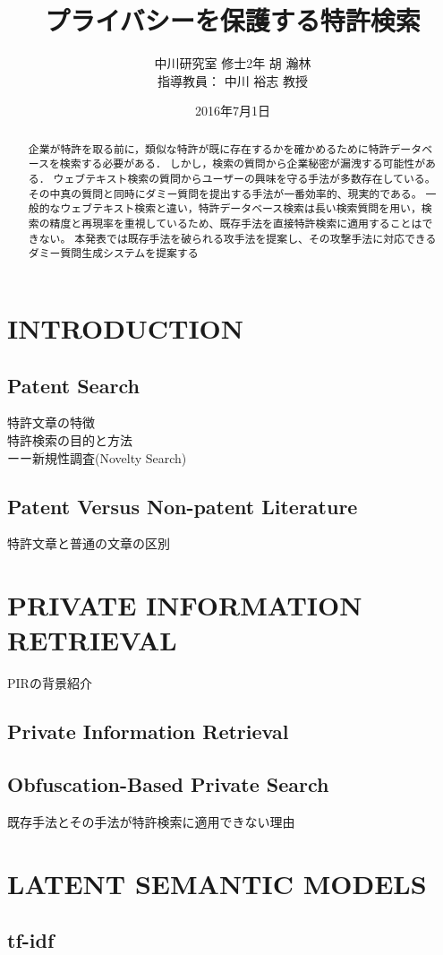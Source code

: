 \documentclass{jsarticle}
\title{プライバシーを保護する特許検索}
\author{中川研究室 修士2年 胡 瀚林\\指導教員： 中川 裕志 教授}
\date{2016年7月1日}
\theoremstyle{definition}
\begin{document}
\maketitle
\begin{abstract}
企業が特許を取る前に，類似な特許が既に存在するかを確かめるために特許データベースを検索する必要がある．
しかし，検索の質問から企業秘密が漏洩する可能性がある．
ウェブテキスト検索の質問からユーザーの興味を守る手法が多数存在している。
その中真の質問と同時にダミー質問を提出する手法が一番効率的、現実的である。
一般的なウェブテキスト検索と違い，特許データベース検索は長い検索質問を用い，検索の精度と再現率を重視しているため、既存手法を直接特許検索に適用することはできない。
本発表では既存手法を破られる攻手法を提案し、その攻撃手法に対応できるダミー質問生成システムを提案する
\end{abstract}


\section{INTRODUCTION}


\subsection{Patent Search}
特許文章の特徴\\
特許検索の目的と方法\\
ーー新規性調査(Novelty Search)
\subsection{Patent Versus Non-patent Literature}
特許文章と普通の文章の区別
\section{PRIVATE INFORMATION RETRIEVAL}
PIRの背景紹介
\subsection{Private Information Retrieval}
\subsection{Obfuscation-Based Private Search}
既存手法とその手法が特許検索に適用できない理由

\section{LATENT SEMANTIC MODELS}
\subsection{tf-idf}
\end{document}
